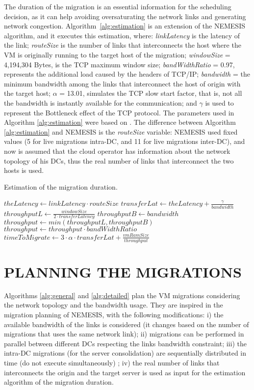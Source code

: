 The duration of the migration is an essential information for the scheduling decision, as it can help avoiding oversaturating the network links and generating network congestion. Algorithm~\ref{alg:estimation} is an extension of the NEMESIS algorithm, and it executes this estimation, where: \textit{linkLatency} is the latency of the link; \textit{routeSize} is the number of links that interconnects the host where the VM is originally running to the target host of the migration; \mbox{\textit{windowSize}} = 4,194,304 Bytes, is the TCP maximum window size; \textit{bandWidthRatio} = 0.97, represents the additional load caused by the headers of TCP/IP; \textit{bandwidth} = the minimum bandwidth among the links that interconnect the host of origin with the target host; $\alpha$ = 13.01, simulates the TCP slow start factor, that is, not all the bandwidth is instantly available for the communication; and $\gamma$ is used to represent the Bottleneck effect of the TCP protocol.  The parameters used in Algorithm \ref{alg:estimation} were based on \cite{velho2013simgridparameters}. The difference between Algorithm \ref{alg:estimation}  and NEMESIS is the \textit{routeSize} variable: NEMESIS used fixed values (5 for live migrations intra-DC, and 11 for live migrations inter-DC), and now is assumed that the cloud operator has information about the network topology of his DCs, thus the real number of links that interconnect the two hosts is used.

\begin{algorithm}
\begin{algorithmic}
\caption{Estimation of the migration duration.}\label{alg:estimation}
\State $theLatency \gets linkLatency \cdot routeSize$
\State $transferLat \gets theLatency + \frac{\gamma}{bandwidth}$
\State $throughputL \gets \frac{windowSize}{2 \cdot transferLatency}$
\State $throughputB \gets bandwidth$
\State $throughput \gets min(throughputL, throughputB)$
\State $throughput \gets throughput 
\cdot bandWidthRatio$
\State $timeToMigrate \gets  3 \cdot \alpha \cdot transferLat + \frac{vmRamSize}{throughput}$ 
\end{algorithmic}
\end{algorithm}

\section{\uppercase{Planning the migrations}}
\label{sec:modeling_smargreens}

Algorithms \ref{alg:general} and \ref{alg:detailed} plan the VM migrations considering the network topology and the bandwidth usage. They are inspired in the migration planning of NEMESIS, with the following modifications: i) the available bandwidth of the links is considered (it changes based on the number of migrations that uses the same network link); ii) migrations can be performed in parallel between different DCs respecting the links bandwidth constraint; iii) the intra-DC migrations (for the server consolidation) are sequentially distributed in time (do not execute simultaneously) ; iv) the real number of links that interconnects the origin and the target server is used as input for the estimation algorithm of the migration duration. 

